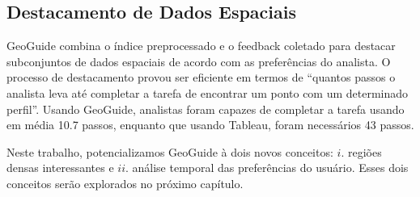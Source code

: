 \subsection{Destacamento de Dados Espaciais}

GeoGuide combina o índice preprocessado e o feedback coletado para destacar subconjuntos de dados espaciais de acordo com as preferências do analista. O processo de destacamento provou ser eficiente em termos de ``quantos passos o analista leva até completar a tarefa de encontrar um ponto com um determinado perfil''. Usando GeoGuide, analistas foram capazes de completar a tarefa usando em média 10.7 passos, enquanto que usando Tableau, foram necessários 43 passos.


\closesubsection
Neste trabalho, potencializamos GeoGuide à dois novos conceitos: $i$. regiões densas interessantes e $ii$. análise temporal das preferências do usuário. Esses dois conceitos serão explorados no próximo capítulo.